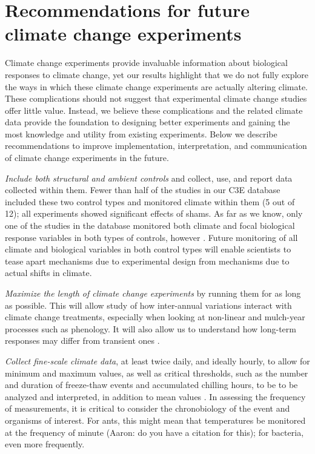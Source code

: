 \documentclass{article}
\begin{document}
\section*{Recommendations for future climate change experiments}
 \par Climate change experiments provide invaluable information about biological responses to climate change, yet our results highlight that we do not fully explore the ways in which these climate change experiments are actually altering climate. These complications should not suggest that experimental climate change studies offer little value. Instead, we believe these complications and the related climate data provide the foundation to designing better experiments and gaining the most knowledge and utility from existing experiments. Below we describe recommendations to improve implementation, interpretation, and communication of climate change experiments in the future.
\par\textit{Include both structural and ambient controls} and collect, use, and report data collected within them. Fewer than half of the studies in our C3E database included these two control types and monitored climate within them (5 out of 12); all experiments showed significant effects of shams. As far as we know, only one of the studies in the database monitored both climate and focal biological response variables in both types of controls, however \citep[ e.g. plant phenology][]{marchin2014}. Future monitoring of all climate and biological variables in both control types will enable scientists to tease apart mechanisms due to experimental design from mechanisms due to actual shifts in climate.  
\par\textit{Maximize the length of climate change experiments} by running them for as long as possible. This will allow study of how inter-annual variations interact with climate change treatments, especially when looking at non-linear and mulch-year processes such as phenology. It will also allow us to understand how long-term responses may differ from  transient ones \citep{franklin1989,giasson2013}. 
\par\textit{Collect fine-scale climate data}, at least twice daily, and ideally hourly, to allow for minimum and maximum values, as well as critical thresholds, such as the number and duration of freeze-thaw events and accumulated chilling hours, to be to be analyzed and interpreted, in addition to mean values \citep{mcdaniel2014}. In assessing the frequency of measurements, it is critical to consider the chronobiology of the event and organisms of interest. For ants, this might mean that temperatures be monitored at the frequency of minute (Aaron: do you have a citation for this); for bacteria, even more frequently.
\end{document}
